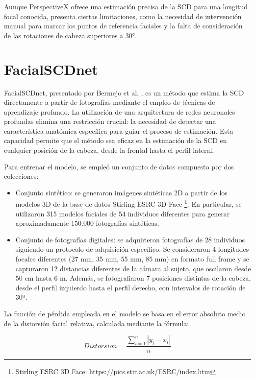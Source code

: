Aunque PerspectiveX ofrece una estimación precisa de la SCD para una longitud focal conocida, presenta ciertas limitaciones, como la necesidad de intervención manual para marcar los puntos de referencia faciales y la falta de consideración de las rotaciones de cabeza superiores a 30°.

\section{FacialSCDnet}

FacialSCDnet, presentado por Bermejo et al. \cite{14}, es un método que estima la SCD directamente a partir de fotografías mediante el empleo de técnicas de aprendizaje profundo. La utilización de una arquitectura de redes neuronales profundas elimina una restricción crucial: la necesidad de detectar una característica anatómica específica para guiar el proceso de estimación. Esta capacidad permite que el método sea eficaz en la estimación de la SCD en cualquier posición de la cabeza, desde la frontal hasta el perfil lateral.

Para entrenar el modelo, se empleó un conjunto de datos compuesto por dos colecciones: 

\begin{itemize}
	\item Conjunto sintético: se generaron imágenes sintéticas 2D a partir de los modelos 3D de la base de datos Stirling ESRC 3D Face \footnote{Stirling ESRC 3D Face: https://pics.stir.ac.uk/ESRC/index.htm}. En particular, se utilizaron 315 modelos faciales de 54 individuos diferentes para generar aproximadamente 150.000 fotografías sintéticas.
	\item Conjunto de fotografías digitales: se adquirieron fotografías de 28 individuos siguiendo un protocolo de adquisición específico. Se consideraron 4 longitudes focales diferentes (27 mm, 35 mm, 55 mm, 85 mm) en formato full frame y se capturaron 12 distancias diferentes de la cámara al sujeto, que oscilaron desde 50 cm hasta 6 m. Además, se fotografiaron 7 posiciones distintas de la cabeza, desde el perfil izquierdo hasta el perfil derecho, con intervalos de rotación de 30º.
\end{itemize}

La función de pérdida empleada en el modelo se basa en el error absoluto medio de la distorsión facial relativa, calculada mediante la fórmula:

\begin{equation}
	Distorsion = \frac{\sum_{i=1}^{n} |y_i - x_i|}{n}
\end{equation}

